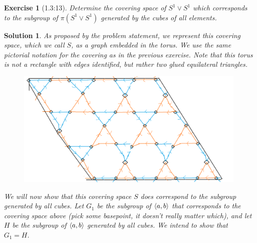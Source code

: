 \documentclass{article}
\theoremstyle{plain}
\newtheorem*{ex}{Exercise}
\theoremstyle{nonumberplain}
\newtheorem{sol}{Solution}
\DeclarePairedDelimiter{\braket}{\langle}{\rangle}
\begin{document}
\begin{ex}[1.3:13]
Determine the covering space of $S^1 \vee S^1$ which corresponds to the subgroup of $\pi(S^1 \vee S^1)$ generated by the cubes of all elements.
\end{ex}

\begin{sol}
As proposed by the problem statement, we represent this covering space, which we call $S$, as a graph embedded in the torus. We use the same pictorial notation for the covering as in the previous exercise. Note that this torus is not a rectangle with edges identified, but rather two glued equilateral triangles.
\begin{figure}[H]
\centering
\includegraphics[width=\linewidth]{cov7}
\end{figure}

We will now show that this covering space $S$ does correspond to the subgroup generated by all cubes. Let $G_1$ be the subgroup of $\braket{a,b}$ that corresponds to the covering space above (pick some basepoint, it doesn't really matter which), and let $H$ be the subgroup of $\braket{a,b}$ generated by all cubes. We intend to show that $G_1 = H$.


\end{sol}
\end{document}
